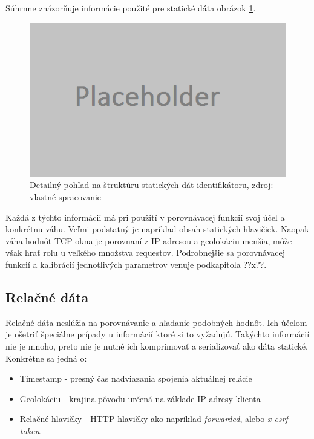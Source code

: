 \documentclass[
  printed, %
  table,   %
  lof,     %
  lot,     %
]{fithesis3}
\begin{document}
Súhrnne znázorňuje informácie použité pre statické dáta obrázok
\ref{fig:footprint-data-static}.

\begin{figure}[h]
  \centering
    \includegraphics[width=.99\textwidth]{images/footprint-data-static.png}
  \caption{Detailný pohľad na štruktúru statických dát identifikátoru, zdroj:
  vlastné spracovanie}
  \label{fig:footprint-data-static}
\end{figure}

Každá z týchto informácii má pri použití v porovnávacej funkcií svoj účel a
konkrétnu váhu. Veľmi podstatný je napríklad obsah statických hlavičiek. Naopak
váha hodnôt TCP okna je porovnaní z IP adresou a geolokáciu menšia, môže však
hrať rolu u veľkého množstva requestov. Podrobnejšie sa porovnávacej funkcií a
kalibrácií jednotlivých parametrov venuje podkapitola ??x??.

\subsection{Relačné dáta}
Relačné dáta neslúžia na porovnávanie a hľadanie podobných hodnôt. Ich účelom
je ošetriť špeciálne prípady u informácií ktoré si to vyžadujú. Takýchto
informácií nie je mnoho, preto nie je nutné ich komprimovať a serializovať ako
dáta statické.
Konkrétne sa jedná o:
\begin{itemize}
    \item Timestamp - presný čas nadviazania spojenia aktuálnej relácie
    \item Geolokáciu - krajina pôvodu určená na základe IP adresy klienta
    \item Relačné hlavičky - HTTP hlavičky ako napríklad
    \textit{forwarded}, alebo \textit{x-csrf-token}. 
\end{itemize}
\end{document}
